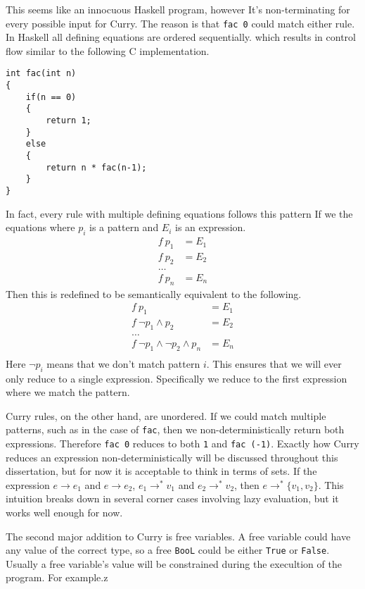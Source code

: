 \documentclass{article}
\begin{document}
This seems like an innocuous Haskell program, however It's non-terminating for every possible input for Curry.
The reason is that \texttt{fac 0} could match either rule.
In Haskell all defining equations are ordered sequentially. which results in control flow similar to the following C
implementation.
\begin{verbatim}
int fac(int n)
{
    if(n == 0)
    {
        return 1;
    }
    else
    {
        return n * fac(n-1);
    }
}
\end{verbatim}
In fact, every rule with multiple defining equations follows this pattern
If we the equations where $p_i$ is a pattern and $E_i$ is an expression.
\begin{align*}
f\ p_1 &= E_1\\
f\ p_2 &= E_2\\
\ldots\\
f\ p_n &= E_n
\end{align*}
Then this is redefined to be semantically equivalent to the following.
\begin{align*}
f\ p_1 &= E_1\\
f\ \neg p_1 \wedge p_2 &= E_2\\
\ldots\\
f\ \neg p_1 \wedge \neg p_2 \wedge p_n &= E_n\\
\end{align*}
Here $\lnot p_i$ means that we don't match pattern $i$.
This ensures that we will ever only reduce to a single expression.
Specifically we reduce to the first expression where we match the pattern.

Curry rules, on the other hand, are unordered.
If we could match multiple patterns, such as in the case of \texttt{fac}, 
then we non-deterministically return both expressions.
Therefore \texttt{fac 0} reduces to both \texttt 1 and \texttt{fac (-1)}.
Exactly how Curry reduces an expression non-deterministically will be discussed throughout this dissertation,
but for now it is acceptable to think in terms of sets.
If the expression $e \rightarrow e_1$ and $e \rightarrow e_2$,
$e_1 \rightarrow^* v_1$ and $e_2 \rightarrow^* v_2$, then $e \rightarrow^* \{v_1, v_2\}$.
This intuition breaks down in several corner cases involving lazy evaluation,
but it works well enough for now.

The second major addition to Curry is free variables.
A free variable could have any value of the correct type,
so a free \texttt{BooL} could be either \texttt{True} or \texttt{False}.
Usually a free variable's value will be constrained during the execultion of the program.
For example.z
\end{document}
